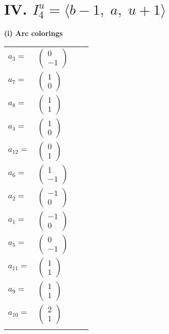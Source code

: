 \documentclass[1p]{elsarticle_modified}
\theoremstyle{definition}
\begin{document}
\centering \section*{IV. $I^u_{4}= \langle b-1,\;a,\;u+1 \rangle$}
\flushleft \textbf{(i) Arc colorings}\\
\begin{tabular}{m{7pt} m{180pt} m{7pt} m{180pt} }
\flushright $a_{3}=$&$\begin{pmatrix}0\\-1\end{pmatrix}$ \\
\flushright $a_{7}=$&$\begin{pmatrix}1\\0\end{pmatrix}$ \\
\flushright $a_{8}=$&$\begin{pmatrix}1\\1\end{pmatrix}$ \\
\flushright $a_{4}=$&$\begin{pmatrix}1\\0\end{pmatrix}$ \\
\flushright $a_{12}=$&$\begin{pmatrix}0\\1\end{pmatrix}$ \\
\flushright $a_{6}=$&$\begin{pmatrix}1\\-1\end{pmatrix}$ \\
\flushright $a_{2}=$&$\begin{pmatrix}-1\\0\end{pmatrix}$ \\
\flushright $a_{1}=$&$\begin{pmatrix}-1\\0\end{pmatrix}$ \\
\flushright $a_{5}=$&$\begin{pmatrix}0\\-1\end{pmatrix}$ \\
\flushright $a_{11}=$&$\begin{pmatrix}1\\1\end{pmatrix}$ \\
\flushright $a_{9}=$&$\begin{pmatrix}1\\1\end{pmatrix}$ \\
\flushright $a_{10}=$&$\begin{pmatrix}2\\1\end{pmatrix}$\\&\end{tabular}
\end{document}
